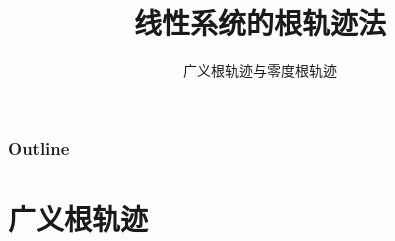 \documentclass{beamer}
\subtitle{广义根轨迹与零度根轨迹}
\title{线性系统的根轨迹法}
\author{}
\date{}
\begin{document}
\maketitle

\begin{frame}
\frametitle{Outline}
\setcounter{tocdepth}{3}
\tableofcontents
\end{frame}

















\section{广义根轨迹}
\label{sec-1}
\end{document}
